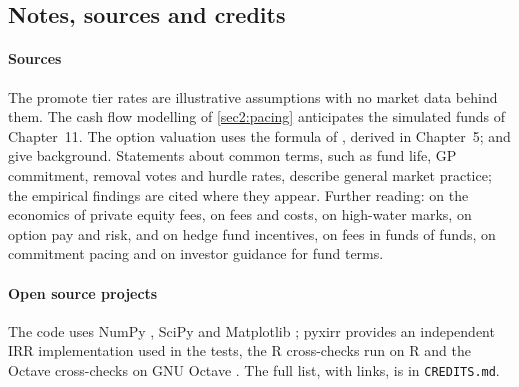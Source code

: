 \begin{chapterrefs}
\FloatBarrier
\section{Notes, sources and credits}
\label{sec2:credits}

\paragraph{Sources}
The promote tier rates are illustrative assumptions with no market data behind them. The cash flow
modelling of \cref{sec2:pacing} anticipates the simulated funds of Chapter~11. The option
valuation uses the formula of \textcite{black1973}, derived in Chapter~5; \textcite{hull2022} and
\textcite{wilmott2006} give background. Statements about common terms, such as fund life, GP commitment, removal votes and hurdle rates,
describe general market practice; the empirical findings are cited where they appear. Further reading: \textcite{metrick2010} on the economics of private equity fees, \textcite{phalippou2009}
on fees and costs, \textcite{goetzmann2003} on high-water marks, \textcite{carpenter2000} on option pay and
risk, \textcite{agarwal2009} and \textcite{brown2001} on hedge fund incentives, \textcite{brown2003} on
fees in funds of funds, \textcite{takahashi2002} on commitment pacing and \textcite{ilpa2019} on investor
guidance for fund terms.

\paragraph{Open source projects}
The code uses NumPy \parencite{numpy}, SciPy \parencite{scipy} and Matplotlib \parencite{matplotlib}; pyxirr \parencite{pyxirr} provides an independent IRR
implementation used in the tests, the R cross-checks run on R \parencite{rcore} and the Octave cross-checks on GNU Octave
\parencite{octave}. The
full list, with links, is in \texttt{CREDITS.md}.

\end{chapterrefs}
